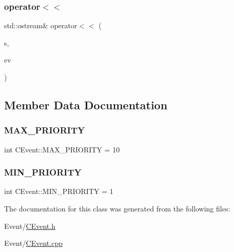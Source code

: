 \mbox{\label{class_c_event_a5d65822e265f6f6537e4acab12bb9119}} 
\subsubsection{\texorpdfstring{operator$<$$<$}{operator<<}\hspace{0.1cm}{\footnotesize\ttfamily [2/2]}}
{\footnotesize\ttfamily std\+::ostream\& operator$<$$<$ (\begin{DoxyParamCaption}\item[{std\+::ostream \&}]{s,  }\item[{const \mbox{\hyperlink{class_c_event}{C\+Event}} $\ast$}]{ev }\end{DoxyParamCaption})\hspace{0.3cm}{\ttfamily [friend]}}



\subsection{Member Data Documentation}
\mbox{\label{class_c_event_acba68da6e8b7dc00527313dc6e253c15}} 
\subsubsection{\texorpdfstring{M\+A\+X\+\_\+\+P\+R\+I\+O\+R\+I\+TY}{MAX\_PRIORITY}}
{\footnotesize\ttfamily int C\+Event\+::\+M\+A\+X\+\_\+\+P\+R\+I\+O\+R\+I\+TY = 10\hspace{0.3cm}{\ttfamily [static]}}

\mbox{\label{class_c_event_ad20159365449be421368c23b0b6377e5}} 
\subsubsection{\texorpdfstring{M\+I\+N\+\_\+\+P\+R\+I\+O\+R\+I\+TY}{MIN\_PRIORITY}}
{\footnotesize\ttfamily int C\+Event\+::\+M\+I\+N\+\_\+\+P\+R\+I\+O\+R\+I\+TY = 1\hspace{0.3cm}{\ttfamily [static]}}



The documentation for this class was generated from the following files\+:\begin{DoxyCompactItemize}
\item 
Event/\mbox{\hyperlink{_c_event_8h}{C\+Event.\+h}}\item 
Event/\mbox{\hyperlink{_c_event_8cpp}{C\+Event.\+cpp}}\end{DoxyCompactItemize}
